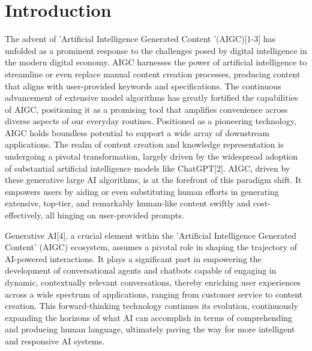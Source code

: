 \documentclass[conference]{IEEEtran}
\begin{document}
\section{Introduction}

The advent of 'Artificial Intelligence Generated Content '(AIGC)[1-3] has unfolded as a prominent response to the challenges posed by digital intelligence in the modern digital economy. AIGC harnesses the power of artificial intelligence to streamline or even replace manual content creation processes, producing content that aligns with user-provided keywords and specifications. The continuous advancement of extensive model algorithms has greatly fortified the capabilities of AIGC, positioning it as a promising tool that amplifies convenience across diverse aspects of our everyday routines. Positioned as a pioneering technology, AIGC holds boundless potential to support a wide array of downstream applications. The realm of content creation and knowledge representation is undergoing a pivotal transformation, largely driven by the widespread adoption of substantial artificial intelligence models like ChatGPT[2]. AIGC, driven by these generative large AI algorithms, is at the forefront of this paradigm shift. It empowers users by aiding or even substituting human efforts in generating extensive, top-tier, and remarkably human-like content swiftly and cost-effectively, all hinging on user-provided prompts. 

\baselineskip

Generative AI[4], a crucial element within the 'Artificial Intelligence Generated Content' (AIGC) ecosystem, assumes a pivotal role in shaping the trajectory of AI-powered interactions. It plays a significant part in empowering the development of conversational agents and chatbots capable of engaging in dynamic, contextually relevant conversations, thereby enriching user experiences across a wide spectrum of applications, ranging from customer service to content creation. This forward-thinking technology continues its evolution, continuously expanding the horizons of what AI can accomplish in terms of comprehending and producing human language, ultimately paving the way for more intelligent and responsive AI systems.
\end{document}
